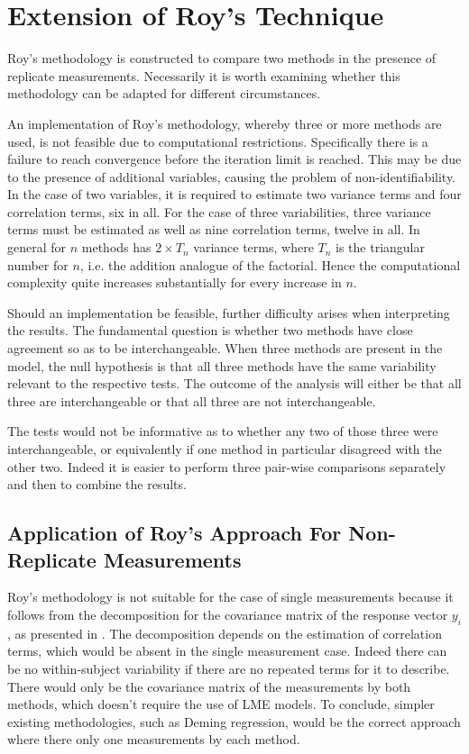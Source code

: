 \documentclass[12pt, a4paper]{report}
\theoremstyle{plain}
\theoremstyle{definition}
\theoremstyle{remark}
\begin{document}
\section{Extension of Roy's Technique}
Roy's methodology is constructed to compare two methods in the presence of replicate measurements. Necessarily it is worth examining whether this methodology can be adapted for different circumstances.

An implementation of Roy's methodology, whereby three or more methods are used, is not feasible due to computational restrictions. Specifically there is a failure to reach convergence before the iteration limit is reached. This may be due to the presence of additional variables, causing the problem of non-identifiability. In the case of two variables, it is required to estimate two variance terms and four correlation terms, six in all. For the case of three variabilities, three variance terms must be estimated as well as nine correlation terms, twelve in all. In general for $n$ methods has $2 \times T_{n}$ variance terms, where $T_n$ is the triangular number for $n$, i.e. the addition analogue of the factorial. Hence the computational complexity quite increases substantially for every increase in $n$.

Should an implementation be feasible, further difficulty arises when interpreting the results. The fundamental question is whether two methods have close agreement so as to be interchangeable. When three methods are present in the model, the null hypothesis is that all three methods have the same variability relevant to the respective tests. The outcome of the analysis will either be that all three are interchangeable or that all three are not interchangeable.

The tests would not be informative as to whether any two of those three were interchangeable, or equivalently if one method in particular disagreed with the other two. Indeed it is easier to perform three pair-wise comparisons separately and then to combine the results.



\subsection{Application of Roy's Approach For Non-Replicate Measurements}

Roy's methodology is not suitable for the case of single measurements because it follows from the decomposition for the covariance matrix of the response vector $y_{i}$, as presented in \citet{hamlett}. The decomposition depends on the estimation of correlation terms, which would be absent in the single measurement case. Indeed there can be no within-subject variability if there are no repeated terms for it to describe. There would only be the covariance matrix of the measurements by both methods, which doesn't require the use of LME models. To conclude, simpler existing methodologies, such as Deming regression, would be the correct approach where there only one measurements by each method.
\end{document}
